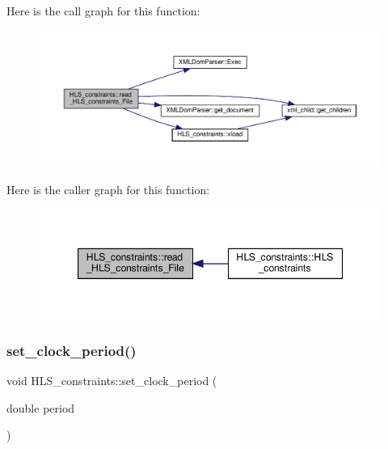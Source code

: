 Here is the call graph for this function\+:
\nopagebreak
\begin{figure}[H]
\begin{center}
\leavevmode
\includegraphics[width=350pt]{dd/d96/classHLS__constraints_abd387f72baf392a410dcfba2995c0ef8_cgraph}
\end{center}
\end{figure}
Here is the caller graph for this function\+:
\nopagebreak
\begin{figure}[H]
\begin{center}
\leavevmode
\includegraphics[width=347pt]{dd/d96/classHLS__constraints_abd387f72baf392a410dcfba2995c0ef8_icgraph}
\end{center}
\end{figure}
\mbox{\label{classHLS__constraints_a709ff2e7748684517916921c94a7175f}} 
\subsubsection{\texorpdfstring{set\+\_\+clock\+\_\+period()}{set\_clock\_period()}}
{\footnotesize\ttfamily void H\+L\+S\+\_\+constraints\+::set\+\_\+clock\+\_\+period (\begin{DoxyParamCaption}\item[{double}]{period }\end{DoxyParamCaption})}



